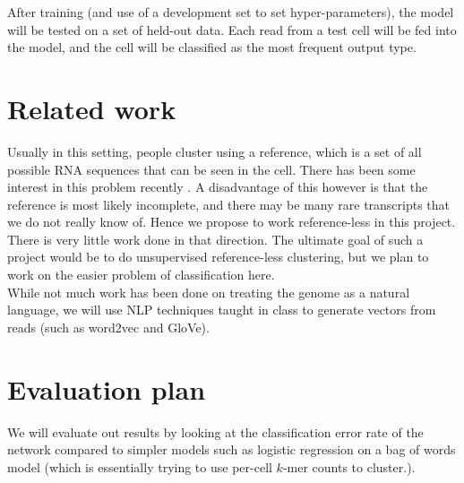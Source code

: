 \documentclass[11pt,onecolumn]{article}
\begin{document}
After training (and use of a development set to set hyper-parameters), the model will be tested on a set of held-out data. Each read from a test cell will be fed into the model, and the cell will be classified as the most frequent output type. 

\section{Related work}
Usually in this setting, people cluster using a reference, which is a set of all possible RNA sequences that can be seen in the cell. There has been some interest in this problem recently \cite{NtrKamZhaPacTse}. A disadvantage of this however is that the reference is most likely incomplete, and there may be many rare transcripts that we do not really know of. Hence we propose to work reference-less in this project. There is very little work done in that direction. The ultimate goal of such a project would be to do unsupervised reference-less clustering, but we plan to work on the easier problem of classification here. \\

While not much work has been done on treating the genome as a natural language, we will use NLP techniques taught in class to generate vectors from reads (such as word2vec and GloVe). 

\section{Evaluation plan}
We will evaluate out results by looking at the classification error rate of the network compared to simpler models such as logistic regression on a bag of words model (which is essentially trying to use per-cell $k$-mer counts to cluster.).



\end{document}
